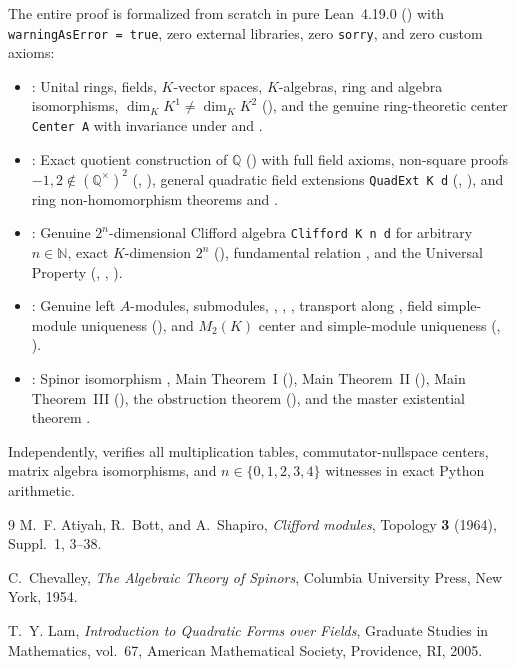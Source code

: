 \documentclass[11pt,a4paper]{article}
\theoremstyle{plain}
\theoremstyle{definition}
\newcommand{\Mat}{M}
\newcommand{\Q}{\mathbb{Q}}
\begin{document}
{\raggedright
The entire proof is formalized from scratch in pure Lean~4.19.0 () with \texttt{warningAsError = true}, zero external libraries, zero \texttt{sorry}, and zero custom axioms:
\begin{itemize}
  \item {}: Unital rings, fields, $K$-vector spaces, $K$-algebras, ring and algebra isomorphisms, $\dim_K K^1 \neq \dim_K K^2$ (), and the genuine ring-theoretic center \texttt{Center A} with invariance under  and .
  \item {}: Exact quotient construction of $\Q$ () with full field axioms, non-square proofs $-1, 2 \notin (\Q^\times)^2$ (, ), general quadratic field extensions \texttt{QuadExt K d} (, ), and ring non-homomorphism theorems  and .
  \item {}: Genuine $2^n$-dimensional Clifford algebra \texttt{Clifford K n d} for arbitrary $n \in \mathbb{N}$, exact $K$-dimension $2^n$ (), fundamental relation , and the Universal Property (, , ).
  \item {}: Genuine left $A$-modules, submodules, , , , transport along , field simple-module uniqueness (), and $\Mat_2(K)$ center and simple-module uniqueness (, ).
  \item {}: Spinor isomorphism , Main Theorem~I (), Main Theorem~II (), Main Theorem~III (), the obstruction theorem (), and the master existential theorem .
\end{itemize}
Independently,  verifies all multiplication tables, commutator-nullspace centers, matrix algebra isomorphisms, and $n \in \{0,1,2,3,4\}$ witnesses in exact Python  arithmetic.\par
}

\begin{thebibliography}{9}
M.~F. Atiyah, R.~Bott, and A.~Shapiro,
\emph{Clifford modules}, Topology \textbf{3} (1964), Suppl.~1, 3--38.

C.~Chevalley,
\emph{The Algebraic Theory of Spinors}, Columbia University Press, New York, 1954.

T.~Y. Lam,
\emph{Introduction to Quadratic Forms over Fields}, Graduate Studies in Mathematics, vol.~67, American Mathematical Society, Providence, RI, 2005.
\end{thebibliography}
\end{document}
